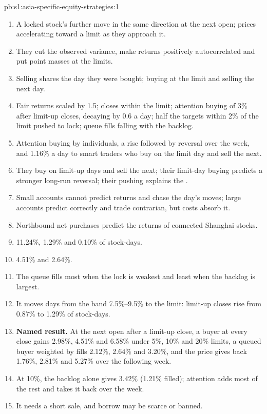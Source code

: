 \begin{solution}{pb:s1:asia-specific-equity-strategies:1}
\begin{enumerate}
\item A locked stock's further move in the same direction at the next open; prices accelerating toward a limit as they approach it.
\item They cut the observed variance, make returns positively autocorrelated and put point masses at the limits.
\item Selling shares the day they were bought; buying at the limit and selling the next day.
\item Fair returns scaled by 1.5; closes within the limit; attention buying of 3\% after limit-up closes, decaying by 0.6 a day; half the targets within
2\% of the limit pushed to lock; queue fills falling with the backlog.
\item Attention buying by individuals, a rise followed by reversal over the week, and 1.16\% a day to smart traders who buy on the limit day and sell the
next.
\item They buy on limit-up days and sell the next; their limit-day buying predicts a stronger long-run reversal; their pushing explains the .
\item Small accounts cannot predict returns and chase the day's moves; large accounts predict correctly and trade contrarian, but costs absorb it.
\item Northbound net purchases predict the returns of connected Shanghai stocks.
\item 11.24\%, 1.29\% and 0.10\% of stock-days.
\item 4.51\% and 2.64\%.
\item The queue fills most when the lock is weakest and least when the backlog is largest.
\item It moves days from the band 7.5\%--9.5\% to the limit: limit-up closes rise from 0.87\% to 1.29\% of stock-days.
\item \textbf{Named result.} At the next open after a limit-up close, a buyer at every close gains 2.98\%, 4.51\% and 6.58\% under 5\%, 10\% and 20\%
limits, a queued buyer weighted by fills 2.12\%, 2.64\% and 3.20\%, and the price gives back 1.76\%, 2.81\% and 5.27\% over the following week.
\item At 10\%, the backlog alone gives 3.42\% (1.21\% filled); attention adds most of the rest and takes it back over the week.
\item It needs a short sale, and borrow may be scarce or banned.

\end{enumerate}
\end{solution}
